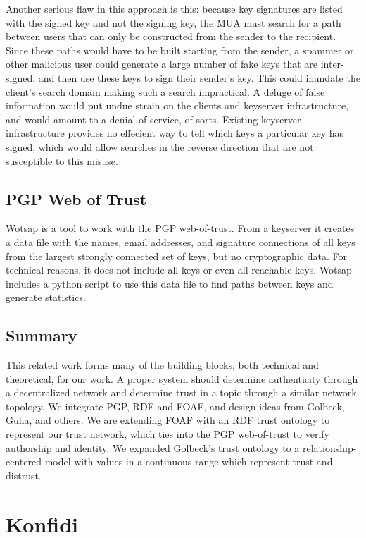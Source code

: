\documentclass[letterpaper]{www2006-submission}
\begin{document}
Another serious flaw in this approach is this:  because key signatures are listed with the signed key and not the signing key, the MUA must search for a path between users that can only be constructed from the sender to the recipient.  Since these paths would have to be built starting from the sender, a spammer or other malicious user could generate a large number of fake keys that are inter-signed, and then use these keys to sign their sender's key.  This could inundate the client's search domain making such a search impractical.  A deluge of false information would put undue strain on the clients and keyserver infrastructure, and would amount to a denial-of-service, of sorts.  Existing keyserver infrastructure provides no effecient way to tell which keys a particular key has signed, which would allow searches in the reverse direction that are not susceptible to this misuse.

\subsection{PGP Web of Trust}
\label{wotsap}
Wotsap \citep{wotsap} is a tool to work with the PGP web-of-trust.  From a keyserver it creates a data file with the names, email addresses, and signature connections of all keys from the largest strongly connected set of keys, but no cryptographic data.  For technical reasons, it does not include all keys or even all reachable keys.  Wotsap includes a python script to use this data file to find paths between keys and generate statistics.

\subsection{Summary}
This related work forms many of the building blocks, both technical and theoretical, for our work.  A proper system should determine authenticity through a decentralized network and determine trust in a topic through a similar network topology.  We integrate PGP, RDF and FOAF, and design ideas from Golbeck, Guha, and others.  We are extending FOAF with an RDF trust ontology to represent our trust network, which ties into the PGP web-of-trust to verify authorship and identity.  We expanded Golbeck's trust ontology to a relationship-centered model with values in a continuous range which represent trust and distrust.

\section{Konfidi}
\end{document}
